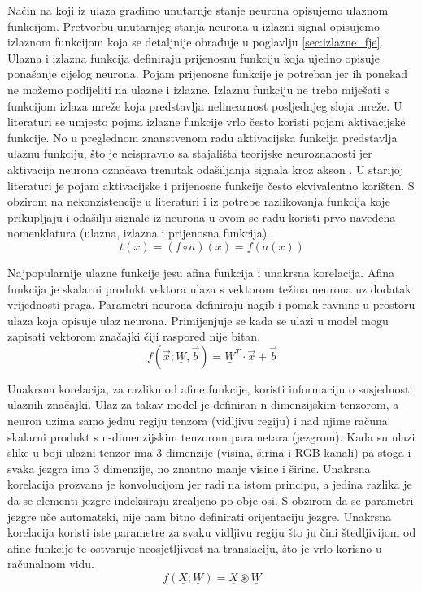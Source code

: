 \documentclass[times, utf8, diplomski]{fer}
\def\mat#1{\underline{#1}}
\begin{document}
Način na koji iz ulaza gradimo unutarnje stanje neurona opisujemo ulaznom funkcijom. Pretvorbu unutarnjeg stanja neurona u izlazni signal opisujemo izlaznom funkcijom koja se detaljnije obrađuje u poglavlju \ref{sec:izlazne_fje}. Ulazna i izlazna funkcija definiraju prijenosnu funkciju koja ujedno opisuje ponašanje cijelog neurona. Pojam prijenosne funkcije je potreban jer ih ponekad ne možemo podijeliti na ulazne i izlazne. Izlaznu funkciju ne treba miješati s funkcijom izlaza mreže koja predstavlja nelinearnost posljednjeg sloja mreže. U literaturi se umjesto pojma izlazne funkcije vrlo često koristi pojam aktivacijske funkcije. No u preglednom znanstvenom radu \citet{function_survey} aktivacijska funkcija predstavlja ulaznu funkciju, što je neispravno sa stajališta teorijske neuroznanosti jer aktivacija neurona označava trenutak odašiljanja signala kroz akson \citep{neuroscience}. U starijoj literaturi je pojam aktivacijske i prijenosne funkcije često ekvivalentno korišten. S obzirom na nekonzistencije u literaturi i iz potrebe razlikovanja funkcija koje prikupljaju i odašilju signale iz neurona u ovom se radu koristi prvo navedena nomenklatura (ulazna, izlazna i prijenosna funkcija).
\begin{equation}
t(x) = (f \circ a)(x) = f(a(x))
\end{equation}

Najpopularnije ulazne funkcije jesu afina funkcija i unakrsna korelacija.
Afina funkcija je skalarni produkt vektora ulaza s vektorom težina neurona uz dodatak vrijednosti praga. Parametri neurona definiraju nagib i pomak ravnine u prostoru ulaza koja opisuje ulaz neurona. Primijenjuje se kada se ulazi u model mogu zapisati vektorom značajki čiji raspored nije bitan.
\begin{equation}
f(\vec{x};\mat{W},\vec{b})=\mat{W}^T \cdot \vec{x} + \vec{b}
\end{equation}

Unakrsna korelacija, za razliku od afine funkcije, koristi informaciju o susjednosti ulaznih značajki. Ulaz za takav model je definiran n-dimenzijskim tenzorom, a neuron uzima samo jednu regiju tenzora (vidljivu regiju) i nad njime računa skalarni produkt s n-dimenzijskim tenzorom parametara (jezgrom). Kada su ulazi slike u boji ulazni tenzor ima 3 dimenzije (visina, širina i RGB kanali) pa stoga i svaka jezgra ima 3 dimenzije, no znantno manje visine i širine. Unakrsna korelacija prozvana je konvolucijom jer radi na istom principu, a jedina razlika je da se elementi jezgre indeksiraju zrcaljeno po obje osi. S obzirom da se parametri jezgre uče automatski, nije nam bitno definirati orijentaciju jezgre. Unakrsna korelacija koristi iste parametre za svaku vidljivu regiju što ju čini štedljivijom od afine funkcije te ostvaruje neosjetljivost na translaciju, što je vrlo korisno u računalnom vidu.
\begin{equation}
f(\mat{X};\mat{W})=\mat{X} \circledast \mat{W}
\end{equation}
\end{document}

